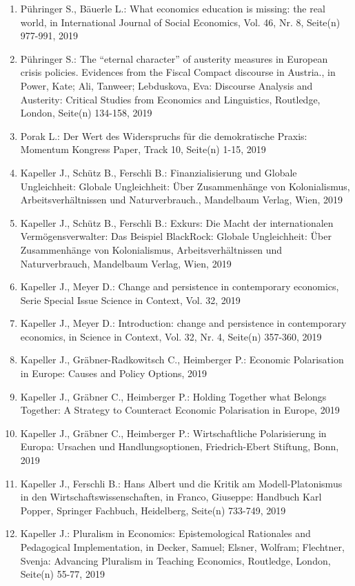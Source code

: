 \begin{enumerate}
	 \item Pühringer S., Bäuerle L.: What economics education is missing: the real world, in International Journal of Social Economics, Vol. 46, Nr. 8, Seite(n) 977-991, 2019
	 \item Pühringer S.: The “eternal character” of austerity measures in European crisis policies. Evidences from the Fiscal Compact discourse in Austria., in Power, Kate; Ali, Tanweer; Lebduskova, Eva: Discourse Analysis and Austerity: Critical Studies from Economics and Linguistics, Routledge, London, Seite(n) 134-158, 2019
	 \item Porak L.: Der Wert des Widerspruchs für die demokratische Praxis: Momentum Kongress Paper, Track 10, Seite(n) 1-15, 2019
	 \item Kapeller J., Schütz B., Ferschli B.: Finanzialisierung und Globale Ungleichheit: Globale Ungleichheit: Über Zusammenhänge von Kolonialismus, Arbeitsverhältnissen und Naturverbrauch., Mandelbaum Verlag, Wien, 2019
	 \item Kapeller J., Schütz B., Ferschli B.: Exkurs: Die Macht der internationalen Vermögensverwalter: Das Beispiel BlackRock: Globale Ungleichheit: Über Zusammenhänge von Kolonialismus, Arbeitsverhältnissen und Naturverbrauch, Mandelbaum Verlag, Wien, 2019
	 \item Kapeller J., Meyer D.: Change and persistence in contemporary economics, Serie Special Issue Science in Context, Vol. 32, 2019
	 \item Kapeller J., Meyer D.: Introduction: change and persistence in contemporary economics, in Science in Context, Vol. 32, Nr. 4, Seite(n) 357-360, 2019
	 \item Kapeller J., Gräbner-Radkowitsch C., Heimberger P.: Economic Polarisation in Europe: Causes and Policy Options, 2019
	 \item Kapeller J., Gräbner C., Heimberger P.: Holding Together what Belongs Together: A Strategy to Counteract Economic Polarisation in Europe, 2019
	 \item Kapeller J., Gräbner C., Heimberger P.: Wirtschaftliche Polarisierung in Europa: Ursachen und Handlungsoptionen, Friedrich-Ebert Stiftung, Bonn, 2019
	 \item Kapeller J., Ferschli B.: Hans Albert und die Kritik am Modell-Platonismus in den Wirtschaftswissenschaften, in Franco, Giuseppe: Handbuch Karl Popper, Springer Fachbuch, Heidelberg, Seite(n) 733-749, 2019
	 \item Kapeller J.: Pluralism in Economics: Epistemological Rationales and Pedagogical Implementation, in Decker, Samuel; Elsner, Wolfram; Flechtner, Svenja: Advancing Pluralism in Teaching Economics, Routledge, London, Seite(n) 55-77, 2019

\end{enumerate}
